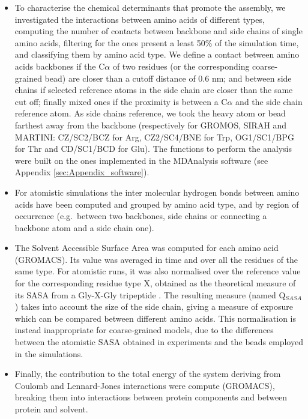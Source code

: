 \begin{itemize}
\item To characterise the chemical determinants that promote the assembly, we investigated the interactions between amino acids of different types, computing the number of contacts between backbone and side chains of single amino acids, filtering for the ones present a least 50\% of the simulation time, and classifying them by amino acid type.
%
We define a contact between amino acids backbones if the C$\alpha$ of two residues (or the corresponding coarse-grained bead) are closer than a cutoff distance of 0.6 nm; and between side chains if selected reference atoms in the side chain are closer than the same cut off; finally mixed ones if the proximity is between a C$\alpha$ and the side chain reference atom. As side chains reference, we took the heavy atom or bead farthest away from the backbone (respectively for GROMOS, SIRAH and MARTINI: CZ/SC2/BCZ for Arg, CZ2/SC4/BNE for Trp, OG1/SC1/BPG for Thr and CD/SC1/BCD for Glu). The functions to perform the analysis were built on the ones implemented in the MDAnalysis software (see Appendix \ref{sec:Appendix_software}).

\item For atomistic simulations the inter molecular hydrogen bonds between amino acids have been computed and grouped by amino acid type, and by region of occurrence (e.g.\ between two backbones, side chains or connecting a backbone atom and a side chain one).

\item The Solvent Accessible Surface Area was computed for each amino acid (GROMACS). Its value was averaged in time and over all the residues of the same type. For atomistic runs, it was also normalised over the reference value for the corresponding residue type X, obtained as the theoretical measure of its SASA from a Gly-X-Gly tripeptide \citep{Tien2013}. The resulting measure (named Q$_{SASA}$) takes into account the size of the side chain, giving a measure of exposure which can be compared between different amino acids. 
%
This normalisation is instead inappropriate for coarse-grained models, due to the differences between the atomistic SASA obtained in experiments and the beads employed in the simulations.

\item Finally, the contribution to the total energy of the system deriving from Coulomb and Lennard-Jones interactions were compute (GROMACS), breaking them into interactions between protein components and between protein and solvent.
\end{itemize}

